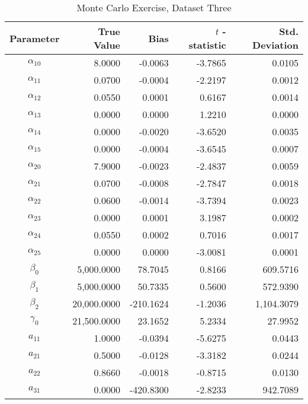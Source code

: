 \begin{table}\onehalfspacing
\begin{center}
\begin{threeparttable}
  \caption{Monte Carlo Exercise, Dataset Three}
  \label{Monte Carlo: Three}
  \begin{tabular}{crrrr}\toprule

  Parameter & True Value & Bias & $t$ - statistic & Std. Deviation \\
  \midrule
  $\alpha_{10}$ &    \phantom{20000}8.0000 &   -0.0063 & -3.7865 &    0.0105 \\
  $\alpha_{11}$ &      0.0700 &   -0.0004 & -2.2197 &    0.0012 \\
  $\alpha_{12}$ &      0.0550 &    0.0001 &  0.6167 &    0.0014 \\
  $\alpha_{13}$ &      0.0000 &    0.0000 &  1.2210 &    0.0000 \\
  $\alpha_{14}$ &      0.0000 &   -0.0020 & -3.6520 &    0.0035 \\
  $\alpha_{15}$ &      0.0000 &   -0.0004 & -3.6545 &    0.0007 \\
  $\alpha_{20}$ &      7.9000 &   -0.0023 & -2.4837 &    0.0059 \\
  $\alpha_{21}$ &      0.0700 &   -0.0008 & -2.7847 &    0.0018 \\
  $\alpha_{22}$ &      0.0600 &   -0.0014 & -3.7394 &    0.0023 \\
  $\alpha_{23}$ &      0.0000 &    0.0001 &  3.1987 &    0.0002 \\
  $\alpha_{24}$ &      0.0550 &    0.0002 &  0.7016 &    0.0017 \\
  $\alpha_{25}$ &      0.0000 &    0.0000 & -3.0081 &    0.0001 \\
  $\beta_{0}$   &   5,000.0000 &   78.7045 &  0.8166 &  609.5716 \\
  $\beta_{1}$   &   5,000.0000 &   50.7335 &  0.5600 &  572.9390 \\
  $\beta_{2}$   &  20,000.0000 & -210.1624 & -1.2036 & 1,104.3079 \\
  $\gamma_{0}$  &  21,500.0000 &   23.1652 &  5.2334 &   27.9952 \\
  $a_{11}$      &      1.0000 &   -0.0394 & -5.6275 &    0.0443 \\
  $a_{21}$      &      0.5000 &   -0.0128 & -3.3182 &    0.0244 \\
  $a_{22}$      &      0.8660 &   -0.0018 & -0.8715 &    0.0130 \\
  $a_{31}$      &      0.0000 & -420.8300 & -2.8233 &  942.7089 \\

\end{tabular}
\end{threeparttable}
\end{center}
\end{table}
